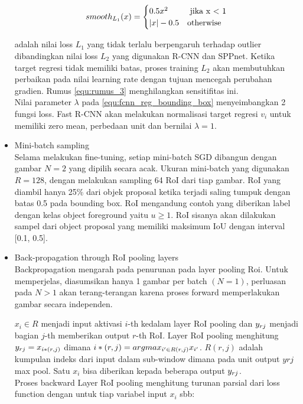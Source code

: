 \begin{itemize}
	\begin{equation}
	\label{equ:rumus_3}	
smooth\sb{L_1}(x) = 
\begin{cases}
0.5x^2 & \text{ jika x < 1} \\
|x| - 0.5 & \text{otherwise} 
\end{cases}
\end{equation}
	
	adalah nilai loss $L_1$ yang tidak terlalu berpengaruh terhadap outlier dibandingkan nilai loss $L_2$ yang digunakan R-CNN dan SPPnet. Ketika target regresi tidak memiliki batas, proses training $L_2$ akan membutuhkan perbaikan pada nilai learning rate dengan tujuan mencegah perubahan gradien. Rumus \ref{equ:rumus_3} menghilangkan sensitifitas ini.\\
	Nilai parameter $\lambda$ pada \ref{equ:fcnn_reg_bounding_box} menyeimbangkan 2 fungsi loss. Fast R-CNN akan melakukan normalisasi target regresi $v_i$ untuk memiliki zero mean, perbedaan unit dan bernilai $\lambda = 1$.
	\item Mini-batch sampling\\
	Selama melakukan fine-tuning, setiap mini-batch SGD dibangun dengan gambar $N = 2$ yang dipilih secara acak. Ukuran mini-batch yang digunakan $R = 128$, dengan melakukan sampling 64 RoI dari tiap gambar. RoI yang diambil hanya 25\% dari objek proposal ketika terjadi saling tumpuk dengan batas 0.5 pada bounding box. RoI mengandung contoh yang diberikan label dengan kelas object foreground yaitu $u \geq 1$. RoI sisanya akan dilakukan sampel dari object proposal yang memiliki maksimum IoU dengan interval [0.1, 0.5].
	
	\item Back-propagation through RoI pooling layers\\
	Backpropagation mengarah pada penurunan pada layer pooling Roi. Untuk memperjelas, diasumsikan hanya 1 gambar per batch $(N = 1)$, perluasan pada $N > 1$ akan terang-terangan karena proses forward memperlakukan gambar secara independen.
	
	$x_i \in R$ menjadi input aktivasi $i$-th kedalam layer RoI pooling dan $y\sb{rj}$ menjadi bagian $j$-th memberikan output $r$-th RoI. Layer RoI pooling menghitung $y\sb{rj} = x\sb{i*(r,j)}$ dimana $i*(r,j) = argmax\sb{i' \in R(r,j)}x\sb{i'}$. $R(r, j)$ adalah kumpulan indeks dari input dalam sub-window dimana pada unit output $yrj$ max pool. Satu $x_i$ bisa diberikan kepada beberapa output $y\sb{rj}$. \\
	Proses backward Layer RoI pooling  menghitung turunan parsial dari loss function dengan untuk tiap variabel input $x_i$ sbb:
	

\end{itemize}
